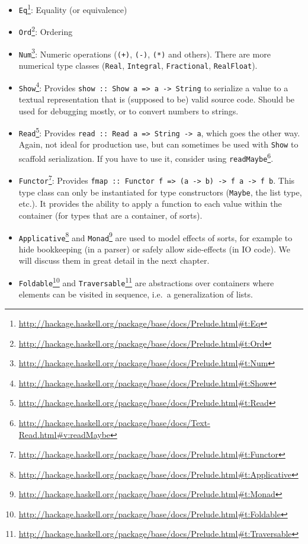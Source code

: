 \documentclass[11pt,
  american,
  DIV13]{article}
\DeclareRobustCommand{\href}[2]{#2\footnote{\url{#1}}}
\begin{document}
\begin{itemize}
\item
  \href{http://hackage.haskell.org/package/base/docs/Prelude.html\#t:Eq}{\texttt{Eq}}:
  Equality (or equivalence)
\item
  \href{http://hackage.haskell.org/package/base/docs/Prelude.html\#t:Ord}{\texttt{Ord}}:
  Ordering
\item
  \href{http://hackage.haskell.org/package/base/docs/Prelude.html\#t:Num}{\texttt{Num}}:
  Numeric operations (\texttt{(+)}, \texttt{(-)}, \texttt{(*)} and
  others). There are more numerical type classes (\texttt{Real},
  \texttt{Integral}, \texttt{Fractional}, \texttt{RealFloat}).
\item
  \href{http://hackage.haskell.org/package/base/docs/Prelude.html\#t:Show}{\texttt{Show}}:
  Provides
  \texttt{show\ ::\ Show\ a\ =\textgreater{}\ a\ -\textgreater{}\ String}
  to serialize a value to a textual representation that is (supposed to
  be) valid source code. Should be used for debugging mostly, or to
  convert numbers to strings.
\item
  \href{http://hackage.haskell.org/package/base/docs/Prelude.html\#t:Read}{\texttt{Read}}:
  Provides
  \texttt{read\ ::\ Read\ a\ =\textgreater{}\ String\ -\textgreater{}\ a},
  which goes the other way. Again, not ideal for production use, but can
  sometimes be used with \texttt{Show} to scaffold serialization. If you
  have to use it, consider using
  \href{http://hackage.haskell.org/package/base/docs/Text-Read.html\#v:readMaybe}{\texttt{readMaybe}}.
\item
  \href{http://hackage.haskell.org/package/base/docs/Prelude.html\#t:Functor}{\texttt{Functor}}:
  Provides
  \texttt{fmap\ ::\ Functor\ f\ =\textgreater{}\ (a\ -\textgreater{}\ b)\ -\textgreater{}\ f\ a\ -\textgreater{}\ f\ b}.
  This type class can only be instantiated for type constructors
  (\texttt{Maybe}, the list type, etc.). It provides the ability to
  apply a function to each value within the container (for types that
  are a container, of sorts).
\item
  \href{http://hackage.haskell.org/package/base/docs/Prelude.html\#t:Applicative}{\texttt{Applicative}}
  and
  \href{http://hackage.haskell.org/package/base/docs/Prelude.html\#t:Monad}{\texttt{Monad}}
  are used to model effects of sorts, for example to hide bookkeeping
  (in a parser) or safely allow side-effects (in IO code). We will
  discuss them in great detail in the next chapter.
\item
  \href{http://hackage.haskell.org/package/base/docs/Prelude.html\#t:Foldable}{\texttt{Foldable}}
  and
  \href{http://hackage.haskell.org/package/base/docs/Prelude.html\#t:Traversable}{\texttt{Traversable}}
  are abstractions over containers where elements can be visited in
  sequence, i.e.~a generalization of lists.
\end{itemize}
\end{document}
